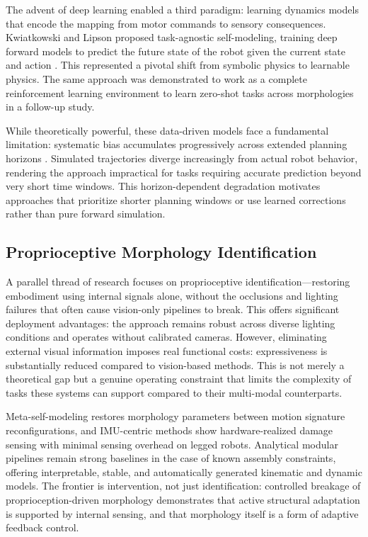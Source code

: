 ﻿\documentclass[12pt,a4paper,oneside]{report}
\begin{document}
The advent of deep learning enabled a third paradigm: learning dynamics models that encode the mapping from motor commands to sensory consequences. Kwiatkowski and Lipson proposed task-agnostic self-modeling, training deep forward models to predict the future state of the robot given the current state and action \cite{kwiatkowski2019task}. This represented a pivotal shift from symbolic physics to learnable physics. The same approach was demonstrated to work as a complete reinforcement learning environment to learn zero-shot tasks across morphologies in a follow-up study.

While theoretically powerful, these data-driven models face a fundamental limitation: systematic bias accumulates progressively across extended planning horizons \cite{kwiatkowski2019task}. Simulated trajectories diverge increasingly from actual robot behavior, rendering the approach impractical for tasks requiring accurate prediction beyond very short time windows. This horizon-dependent degradation motivates approaches that prioritize shorter planning windows or use learned corrections rather than pure forward simulation.

\subsection{Proprioceptive Morphology Identification}

A parallel thread of research focuses on proprioceptive identification---restoring embodiment using internal signals alone, without the occlusions and lighting failures that often cause vision-only pipelines to break. This offers significant deployment advantages: the approach remains robust across diverse lighting conditions and operates without calibrated cameras. However, eliminating external visual information imposes real functional costs: expressiveness is substantially reduced compared to vision-based methods. This is not merely a theoretical gap but a genuine operating constraint that limits the complexity of tasks these systems can support compared to their multi-modal counterparts.

Meta-self-modeling restores morphology parameters between motion signature reconfigurations, and IMU-centric methods show hardware-realized damage sensing with minimal sensing overhead on legged robots. Analytical modular pipelines remain strong baselines in the case of known assembly constraints, offering interpretable, stable, and automatically generated kinematic and dynamic models. The frontier is intervention, not just identification: controlled breakage of proprioception-driven morphology demonstrates that active structural adaptation is supported by internal sensing, and that morphology itself is a form of adaptive feedback control.
\end{document}
